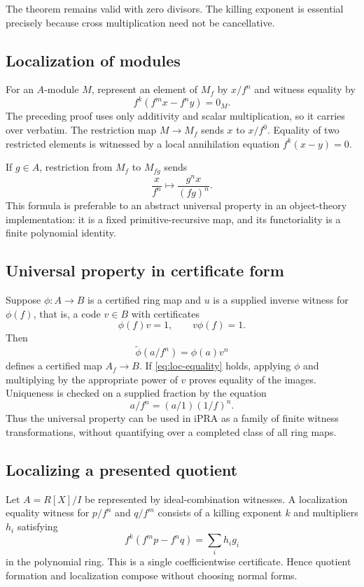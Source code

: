 The theorem remains valid with zero divisors.  The killing exponent is essential precisely because
cross multiplication need not be cancellative.

\subsection{Localization of modules}

For an $A$-module $M$, represent an element of $M_f$ by $x/f^n$ and witness equality by
\[
             f^k(f^m x-f^n y)=0_M.
\]
The preceding proof uses only additivity and scalar multiplication, so it carries over verbatim.
The restriction map $M\to M_f$ sends $x$ to $x/f^0$.  Equality of two restricted elements is
witnessed by a local annihilation equation $f^k(x-y)=0$.

If $g\in A$, restriction from $M_f$ to $M_{fg}$ sends
\[
             \frac{x}{f^n}\longmapsto \frac{g^n x}{(fg)^n}.
\]
This formula is preferable to an abstract universal property in an object-theory implementation:
it is a fixed primitive-recursive map, and its functoriality is a finite polynomial identity.

\subsection{Universal property in certificate form}

Suppose $\phi:A\to B$ is a certified ring map and $u$ is a supplied inverse witness for $\phi(f)$,
that is, a code $v\in B$ with certificates
\[
          \phi(f)v=1,
          \qquad v\phi(f)=1.
\]
Then
\[
       \widetilde\phi(a/f^n)=\phi(a)v^n
\]
defines a certified map $A_f\to B$.  If \eqref{eq:loc-equality} holds, applying $\phi$ and multiplying
by the appropriate power of $v$ proves equality of the images.  Uniqueness is checked on a supplied
fraction by the equation
\[
 a/f^n=(a/1)(1/f)^n.
\]
Thus the universal property can be used in iPRA as a family of finite witness transformations,
without quantifying over a completed class of all ring maps.

\subsection{Localizing a presented quotient}

Let $A=R[X]/I$ be represented by ideal-combination witnesses.  A localization equality witness for
$p/f^n$ and $q/f^m$ consists of a killing exponent $k$ and multipliers $h_i$ satisfying
\[
 f^k(f^m p-f^n q)=\sum_i h_i g_i
\]
in the polynomial ring.  This is a single coefficientwise certificate.  Hence quotient formation and
localization compose without choosing normal forms.

